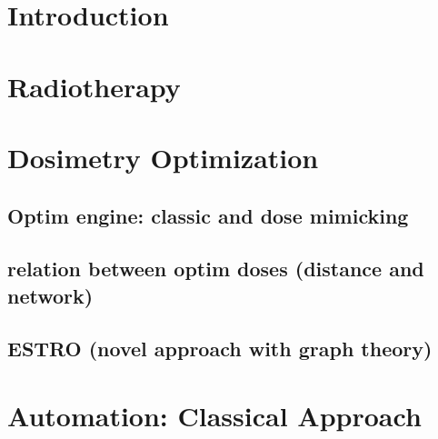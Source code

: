 \documentclass[a4paper]{book}
\begin{document}
	
	
	
	
	
	
	
	\listoffigures
	\listoftables
	\tableofcontents
	\chapterStyleToC
	
	\chapter{Introduction}
	\begin{chapterabstract}
		
	\end{chapterabstract}
	\clearpage
	\localtableofcontents
	
	
	\chapter{Radiotherapy}
	\begin{chapterabstract}
		
	\end{chapterabstract}
	\clearpage
	\localtableofcontents
	
	
	\chapter{Dosimetry Optimization}
	\begin{chapterabstract}
	\end{chapterabstract}
	\clearpage
	\localtableofcontents
	\section{Optim engine: classic and dose mimicking}
	\section{relation between optim doses (distance and network)}
	\section{ESTRO (novel approach with graph theory)}
	
	\chapter{Automation: Classical Approach}
	\begin{chapterabstract}
	\end{chapterabstract}
	\clearpage
	\localtableofcontents
\end{document}
